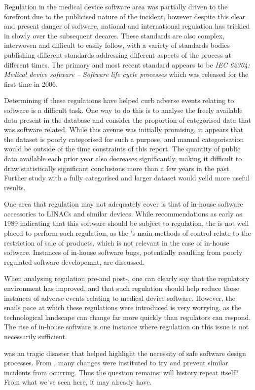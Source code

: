 \documentclass{cshonours}
\begin{document}
Regulation in the medical device software area was partially driven to the forefront due to the publicised nature of the \ther incident, however despite this clear and present danger of software, national and international regulation has trickled in slowly over the subsequent decares. These standards are also complex, interwoven and difficult to easily follow, with a variety of standards bodies publishing different standards addressing different aspects of the process at different times. The primary and most recent standard appears to be \textit{IEC 62304: Medical device software -- Software life cycle processes} which was released for the first time in 2006.

Determining if these regulations have helped curb adverse events relating to software is a difficult task. One way to do this is to analyse the freely available data present in the \fda \maude database and consider the proportion of categorised data that was software related. While this avenue was initially promising, it appears that the dataset is poorly categorised for such a purpose, and manual categorisation would be outside of the time constraints of this report. The quantity of public data available each prior year also decreases significantly, making it difficult to draw statistically significant conclusions more than a few years in the past. Further study with a fully categorised and larger dataset would yeild more useful results.

One area that regulation may not adequately cover is that of in-house software accessories to LINACs and similar devices. While \fda recommendations as early as 1989 indicating that this software should be subject to regulation, the \fda is not well placed to perform such regulation, as the \fda's main methods of control relate to the restriction of sale of products, which is not relevant in the case of in-house software. Instances of in-house software bugs, potentially resulting from poorly regulated software developemnt, are discussed.

When analysing regulation pre-\ther and post-\ther, one can clearly say that the regulatory environment has improved, and that such regulation should help reduce those instances of adverse events relating to medical device software. However, the snails pace at which these regulations were introduced is very worrying, as the technological landscape can change far more quickly than regulators can respond. The rise of in-house software is one instance where regulation on this issue is not necessarily sufficient. 

\ther was an tragic disaster that helped highlight the necessity of safe software design processes. From \ther, many changes were instituted to try and prevent similar incidents from ocurring. Thus the question remains; will history repeat itself? From what we've seen here, it may already have.


\appendix


\end{document}
